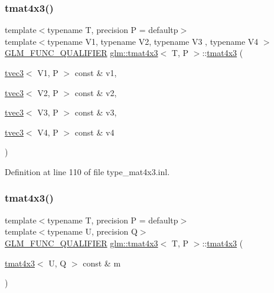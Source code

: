 \subsubsection{\texorpdfstring{tmat4x3()}{tmat4x3()}\hspace{0.1cm}{\footnotesize\ttfamily [21/22]}}
{\footnotesize\ttfamily template$<$typename T, precision P = defaultp$>$ \\
template$<$typename V1, typename V2, typename V3 , typename V4 $>$ \\
\mbox{\hyperlink{setup_8hpp_a33fdea6f91c5f834105f7415e2a64407}{G\+L\+M\+\_\+\+F\+U\+N\+C\+\_\+\+Q\+U\+A\+L\+I\+F\+I\+ER}} \mbox{\hyperlink{structglm_1_1tmat4x3}{glm\+::tmat4x3}}$<$ T, P $>$\+::\mbox{\hyperlink{structglm_1_1tmat4x3}{tmat4x3}} (\begin{DoxyParamCaption}\item[{\mbox{\hyperlink{structglm_1_1tvec3}{tvec3}}$<$ V1, P $>$ const \&}]{v1,  }\item[{\mbox{\hyperlink{structglm_1_1tvec3}{tvec3}}$<$ V2, P $>$ const \&}]{v2,  }\item[{\mbox{\hyperlink{structglm_1_1tvec3}{tvec3}}$<$ V3, P $>$ const \&}]{v3,  }\item[{\mbox{\hyperlink{structglm_1_1tvec3}{tvec3}}$<$ V4, P $>$ const \&}]{v4 }\end{DoxyParamCaption})}



Definition at line 110 of file type\+\_\+mat4x3.\+inl.

\mbox{\label{structglm_1_1tmat4x3_a977e48f213b5720e0c38342c955cfd3e}} 
\subsubsection{\texorpdfstring{tmat4x3()}{tmat4x3()}\hspace{0.1cm}{\footnotesize\ttfamily [22/22]}}
{\footnotesize\ttfamily template$<$typename T, precision P = defaultp$>$ \\
template$<$typename U, precision Q$>$ \\
\mbox{\hyperlink{setup_8hpp_a33fdea6f91c5f834105f7415e2a64407}{G\+L\+M\+\_\+\+F\+U\+N\+C\+\_\+\+Q\+U\+A\+L\+I\+F\+I\+ER}} \mbox{\hyperlink{structglm_1_1tmat4x3}{glm\+::tmat4x3}}$<$ T, P $>$\+::\mbox{\hyperlink{structglm_1_1tmat4x3}{tmat4x3}} (\begin{DoxyParamCaption}\item[{\mbox{\hyperlink{structglm_1_1tmat4x3}{tmat4x3}}$<$ U, Q $>$ const \&}]{m }\end{DoxyParamCaption})}



